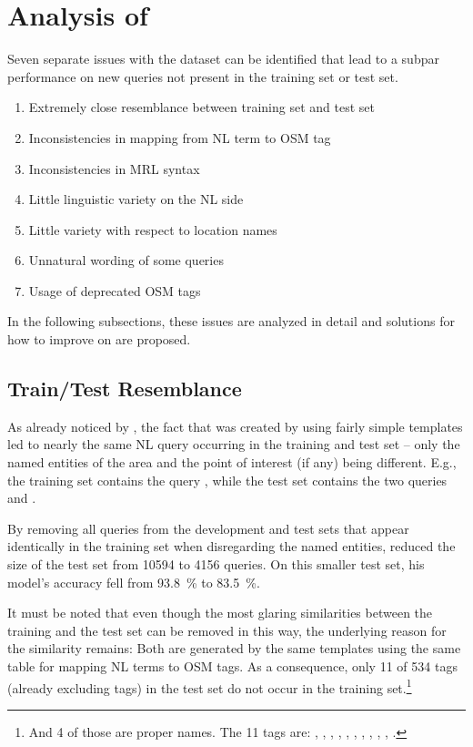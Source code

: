 \section{Analysis of \nlmapstwo{}}

Seven separate issues with the \nlmapstwo{} dataset can be identified that lead
to a subpar performance on new queries not present in the training set or test
set.

\begin{enumerate}
\item Extremely close resemblance between training set and test set
\item Inconsistencies in mapping from NL term to OSM tag
\item Inconsistencies in MRL syntax
\item Little linguistic variety on the NL side
\item Little variety with respect to location names
\item Unnatural wording of some queries
\item Usage of deprecated OSM tags
\end{enumerate}
In the following subsections, these issues are analyzed in detail and solutions
for how to improve on \nlmapstwo{} are proposed.

\subsection{Train/Test Resemblance}

As already noticed by \textcite{staniek-2020}, the fact that \nlmapstwo{} was
created by using fairly simple templates led to nearly the same NL query
occurring in the training and test set – only the named entities of the area and
the point of interest (if any) being different. E.g., the training set contains
the query , while the test set contains the
two queries  and .

By removing all queries from the development and test sets that appear
identically in the training set when disregarding the named entities,
\textcite{staniek-2020} reduced the size of the test set from \num{10594}
to \num{4156} queries. On this smaller test set, his model’s accuracy fell from
\SI{93.8}{\%} to \SI{83.5}{\%}.

It must be noted that even though the most glaring similarities between the
training and the test set can be removed in this way, the underlying reason for
the similarity remains: Both are generated by the same templates using the same
table for mapping NL terms to OSM tags. As a consequence, only \num{11} of
\num{534} tags (already excluding  tags) in the test set do not
occur in the training set.\footnote{And \num{4} of those are proper names. The
  \num{11} tags are: ,
  , , ,
  , , ,
  , ,
  , .}

